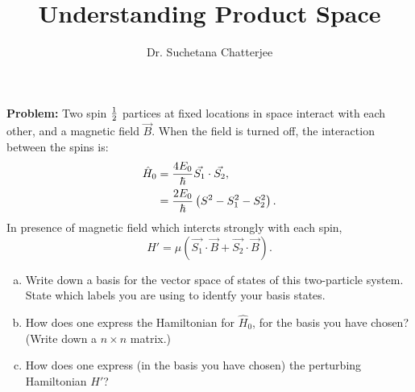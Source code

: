 \documentclass[12pt]{article}
\title{Understanding Product Space}
\author{Dr. Suchetana Chatterjee}
\begin{document}
\maketitle
\textbf{Problem:} Two spin ${1}\over{2}$ partices at fixed locations in space interact with each other, and a magnetic field $\vec{B}$. When the field is turned off, the interaction between the spins is: $$\begin{aligned}
\hat{H}_0 &= {{4 E_0}\over {\hbar}} \vec{S_1}\cdot \vec{S_2}, \\
&= {{2 E_0}\over{\hbar}} \left(S^2-S_1^2-S_2^2\right).
\end{aligned}$$
In presence of magnetic field which intercts strongly with each spin,
$$
H'=\mu (\vec{S_1}\cdot \vec{B} + \vec{S_2} \cdot \vec{B}).
$$
\begin{enumerate}[a)]
\item Write down a basis for the vector space of states of this two-particle system. State which labels you are using to identfy your basis states.
\item How does one express the Hamiltonian for $\hat{H}_0$, for the basis you have chosen? (Write down a $n \times n$ matrix.)
\item How does one express (in the basis you have chosen) the perturbing Hamiltonian $H'$? \\
\end{enumerate}
\end{document}
